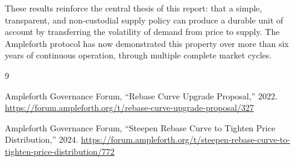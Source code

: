 \documentclass[11pt]{article}
\begin{document}
These results reinforce the central thesis of this report: that a simple, transparent, and
non-custodial supply policy can produce a durable unit of account by transferring the
volatility of demand from price to supply. The Ampleforth protocol has now demonstrated this
property over more than six years of continuous operation, through multiple complete market
cycles.

\begin{thebibliography}{9}

Ampleforth Governance Forum,
``Rebase Curve Upgrade Proposal,'' 2022.
\url{https://forum.ampleforth.org/t/rebase-curve-upgrade-proposal/327}

Ampleforth Governance Forum,
``Steepen Rebase Curve to Tighten Price Distribution,'' 2024.
\url{https://forum.ampleforth.org/t/steepen-rebase-curve-to-tighten-price-distribution/772}

\end{thebibliography}
\end{document}
